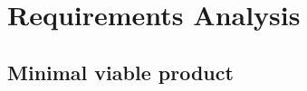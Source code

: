 \section{Requirements Analysis}
\label{sec:requ-analys}

\subsection{Minimal viable product}
\label{ssec:mvp}

